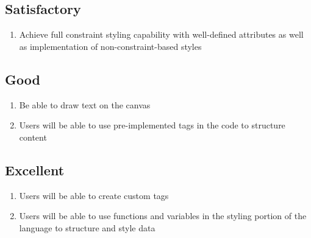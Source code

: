 \documentclass{article}
\begin{document}
\subsection*{Satisfactory}
\begin{enumerate}
	\item Achieve full constraint styling capability with well-defined
            attributes as well as implementation of non-constraint-based
            styles
\end{enumerate}

\subsection*{Good}
\begin{enumerate}
	\item Be able to draw text on the canvas
	\item Users will be able to use pre-implemented tags in the code to structure content
\end{enumerate}

\subsection*{Excellent}
\begin{enumerate}
	\item Users will be able to create custom tags
	\item Users will be able to use functions and variables 
		in the styling portion of the language to structure and
		style data
\end{enumerate}
\end{document}
